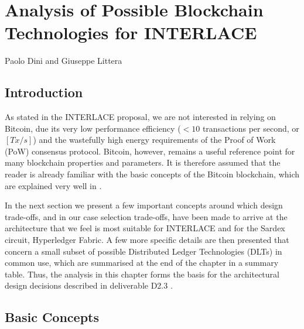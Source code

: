 \chapter{Analysis of Possible Blockchain Technologies for INTERLACE}
\label{ch:dlt}

\vspace{-1cm}
\begin{center}
Paolo Dini and Giuseppe Littera
\end{center}

\section{Introduction}
As stated in the INTERLACE proposal, we are not interested in relying on Bitcoin, due its very low performance efficiency ($< 10$ transactions per second, or $[Tx/s]$) and the wastefully high energy requirements of the Proof of Work (PoW) consensus protocol. Bitcoin, however, remains a useful reference point for many blockchain properties and parameters. It is therefore assumed that the reader is already familiar with the basic concepts of the Bitcoin blockchain, which are explained very well in \cite{Antonopoulos2015}.

In the next section we present a few important concepts around which design trade-offs, and in our case selection trade-offs, have been made to arrive at the architecture that we feel is most suitable for INTERLACE and for the Sardex circuit, Hyperledger Fabric. A few more specific details are then presented that concern a small subset of possible Distributed Ledger Technologies (DLTs) in common use, which are summarised at the end of the chapter in a summary table. Thus, the analysis in this chapter forms the basis for the architectural design decisions described in deliverable D2.3 \cite{INTERLACE_D23}.

\section{Basic Concepts}
